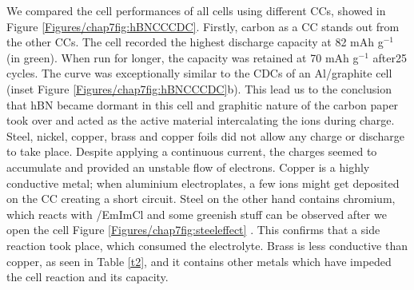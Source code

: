  We compared the cell performances of all cells using different CCs, showed in Figure \ref{Figures/chap7fig:hBNCCCDC}. Firstly, carbon as a CC stands out from the other CCs. The cell recorded the highest discharge capacity at 82 mAh g$^{-1}$ (in green). When run for longer, the capacity was retained at 70 mAh g$^{-1}$ after25 cycles. The curve was exceptionally similar to the CDCs of an Al/graphite cell (inset Figure \ref{Figures/chap7fig:hBNCCCDC}b). This lead us to the conclusion that hBN became dormant in this cell and graphitic nature of the carbon paper took over and acted as the active material intercalating the  ions during charge. Steel, nickel, copper, brass and copper foils did not allow any charge or discharge to take place. Despite applying a continuous current, the charges seemed to accumulate and provided an unstable flow of electrons. Copper is a highly conductive metal; when aluminium electroplates, a few ions might get deposited on the CC creating a short circuit. Steel on the other hand contains chromium, which reacts with /EmImCl and some greenish stuff can be observed after we open the cell Figure \ref{Figures/chap7fig:steeleffect} \cite{reed_roles_2013}. This confirms that a side reaction took place, which consumed the electrolyte. Brass is less conductive than copper, as seen in Table \ref{t2}, and it contains other metals which have impeded the cell reaction and its capacity.   
